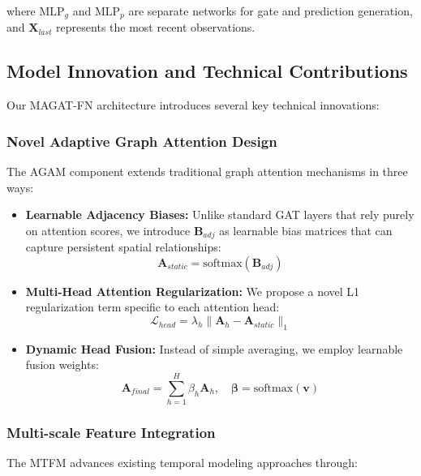 \documentclass[lettersize, journal]{IEEEtran}
\begin{document}
where $\text{MLP}_g$ and $\text{MLP}_p$ are separate networks for gate and prediction generation, and $\mathbf{X}_{last}$ represents the most recent observations.

\subsection{Model Innovation and Technical Contributions}
Our MAGAT-FN architecture introduces several key technical innovations:

\subsubsection{Novel Adaptive Graph Attention Design}
The AGAM component extends traditional graph attention mechanisms in three ways:

\begin{itemize}
    \item \textbf{Learnable Adjacency Biases:} Unlike standard GAT layers that rely purely on attention scores, we introduce $\mathbf{B}_{adj}$ as learnable bias matrices that can capture persistent spatial relationships:
    \begin{equation}
    \mathbf{A}_{static} = \text{softmax}(\mathbf{B}_{adj})
    \end{equation}
    
    \item \textbf{Multi-Head Attention Regularization:} We propose a novel L1 regularization term specific to each attention head:
    \begin{equation}
    \mathcal{L}_{head} = \lambda_{h}\|\mathbf{A}_{h} - \mathbf{A}_{static}\|_1
    \end{equation}
    
    \item \textbf{Dynamic Head Fusion:} Instead of simple averaging, we employ learnable fusion weights:
    \begin{equation}
    \mathbf{A}_{final} = \sum_{h=1}^H \beta_h \mathbf{A}_h, \quad \boldsymbol{\beta} = \text{softmax}(\mathbf{v})
    \end{equation}
\end{itemize}

\subsubsection{Multi-scale Feature Integration}
The MTFM advances existing temporal modeling approaches through:
\end{document}
